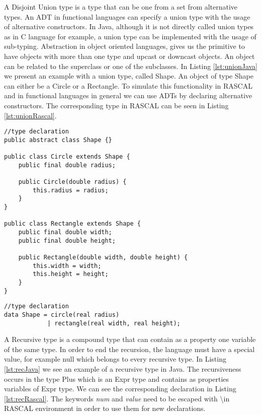 % 
A Disjoint Union type is a type that can be one from a set from alternative types. An ADT in functional languages can specify a union type with the usage of alternative constructors. In Java, although it is not directly called union types as in C language for example, a union type can be implemented with the usage of sub-typing. Abstraction in object oriented languages, gives us the primitive to have objects with more than one type and upcast or downcast objects. An object can be related to the superclass or one of the subclasses. In Listing \ref{lst:unionJava} we present an example with a union type, called Shape. An object of type Shape can either be a Circle or a Rectangle. To simulate this functionality in RASCAL and in functional languages in general we can use ADTs by declaring alternative constructors. The corresponding type in RASCAL can be seen in Listing \ref{lst:unionRascal}.

\begin{lstlisting}[label=lst:unionJava,caption=Declaration example of a Disjoint Union type in Java.]
//type declaration
public abstract class Shape {}

public class Circle extends Shape {
	public final double radius;
	
	public Circle(double radius) {
		this.radius = radius;
	}
}

public class Rectangle extends Shape {
	public final double width;
	public final double height;
	
	public Rectangle(double width, double height) {
		this.width = width;
		this.height = height;
	}
}
\end{lstlisting}

\begin{lstlisting}[label=lst:unionRascal,caption=Mapping example of a Disjoint Union type in RASCAL.]
//type declaration
data Shape = circle(real radius)
			| rectangle(real width, real height); 
\end{lstlisting}


A Recursive type is a compound type that can contain as a property one variable of the same type. In order to end the recursion, the language must have a special value, for example null which belongs to every recursive type\cite{paradigms}. In Listing \ref{lst:recJava} we see an example of a recursive type in Java. The recursiveness occurs in the type Plus which is an Expr type and contains as properties variables of Expr type.  We can see the corresponding declaration in Listing \ref{lst:recRascal}. The keywords \textsl{num} and \textsl{value} need to be escaped with \textbackslash in RASCAL environment in order to use them for new declarations.

